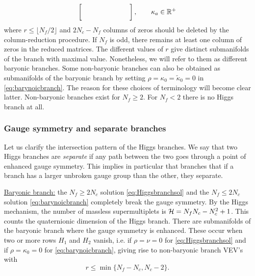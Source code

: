 \begin{itemize}
\begin{itemize}[label=$\triangleright$]
\begin{align}
\begin{split}
\begin{bmatrix}
                                & & & & & & & \\
                                & & & & & & &
                            \end{bmatrix},\qquad\kappa_a\in\mathbb{R}^+\\
                        \end{split}\label{eq:nonbarynoicbranch}
                    \end{align}
                    where $r\leq \lfloor N_f/2\rfloor$ and $2N_c-N_f$ columns of zeros should be deleted by the column-reduction procedure. If $N_f$ is odd, there remains at least one column of zeros in the reduced matrices. The different values of $r$ give distinct submanifolds of the branch with maximal value. Nonetheless, we will refer to them as different baryonic branches. Some non-baryonic branches can also be obtained as submanifolds of the baryonic branch by setting $\rho=\kappa_0=\tilde{\kappa}_0=0$ in \eqref{eq:barynoicbranch}. The reason for these choices of terminology will become clear latter. Non-baryonic branches exist for $N_f\geq2$. For $N_f<2$ there is no Higgs branch at all.
                \end{itemize}
            \end{itemize}
        
        \subsubsection{Gauge symmetry and separate branches}

            Let us clarify the intersection pattern of the Higgs branches. We say that two Higgs branches are \emph{separate} if any path between the two goes through a point of enhanced gauge symmetry. This implies in particular that branches that if a branch has a larger unbroken gauge group than the other, they separate.

            \underline{Baryonic branch:} the $N_f\geq2N_c$ solution \eqref{eq:Higgsbranchsol} and the $N_f\leq2N_c$ solution \eqref{eq:barynoicbranch} completely break the gauge symmetry. By the Higgs mechanism, the number of massless supermultiplets is $\mathcal{H}=N_fN_c-N^2_c+1$. This counts the quaternionic dimension of the Higgs branch. There are submanifolds of the baryonic branch where the gauge symmetry is enhanced. These occur when two or more rows $H_1$ and $H_2$ vanish, i.e. if $\rho=\nu=0$ for \eqref{eq:Higgsbranchsol} and if $\rho=\kappa_0=0$ for \eqref{eq:barynoicbranch}, giving rise to non-baryonic branch VEV's \label{eq:nonbarynoicbranch} with
            \begin{equation}
                r\leq \min\{N_f-N_c,N_c-2\}.\label{eq:rrange}
            \end{equation}

